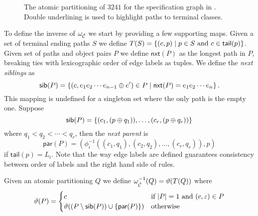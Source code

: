 \begin{figure}[ht!]
    \centering
    
    \caption{The atomic partitioning of $3241$ for the specification graph in . Double underlining is used to highlight paths to terminal classes.}
    \label{fig:atomic_partitioning}
\end{figure}

To define the inverse of $\omega_{\check{\mathcal{C}}}$ we start by providing a few supporting maps. Given a set of terminal ending paths $S$ we define $T(S) = \left\{(c,p) \mid p \in S \text{ and } c \in \textsf{tail}(p)\right\}$. Given set of paths and object pairs $P$ we define $\textsf{nxt}(P)$ as the longest path in $P$, breaking ties with lexicographic order of edge labels as tuples. We define the \emph{next siblings} as
\[
    \textsf{sib}(P) = \left\{(c, e_1e_2 \dotsm e_{n-1} \oplus e') \in P \mid \textsf{nxt}(P) = e_1e_2 \dotsm e_n\right\}.
\]
This mapping is undefined for a singleton set where the only path is the empty one. Suppose
\[
    \textsf{sib}(P) = \left\{(c_1, (p \oplus q_1)),\dotsc, (c_r, (p \oplus q_r))\right\}
\]
where $q_1 < q_2 < \dotsm < q_r$, then the \emph{next parent} is
\[
    \textsf{par}(P) = (\phi^{-1}_i((c_1,q_1), (c_2,q_2), \dotsc, (c_r,q_r)),p)
\]
if $\textsf{tail}(p) = L_i$. Note that the way edge labels are defined guarantees consistency between order of labels and the right hand side of rules.

Given an atomic partitioning $Q$ we define $\omega^{-1}_{\check{\mathcal{C}}}(Q) = \vartheta(T(Q))$ where
\[
    \vartheta(P) = \begin{cases}
        c & \text{if } |P| = 1 \text{ and } (c, \varepsilon) \in P\\
        \vartheta(\left(P \setminus \textsf{sib}(P)\right) \cup \left\{\textsf{par}(P)\right\}) & \text{otherwise}
    \end{cases}
\]

